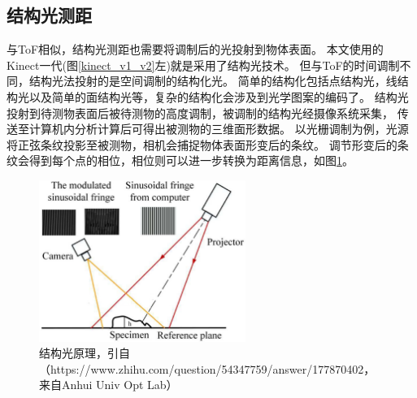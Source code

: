 \subsection{结构光测距}
与ToF相似，结构光测距也需要将调制后的光投射到物体表面。
本文使用的Kinect一代(图\ref{kinect_v1_v2}左)就是采用了结构光技术。
但与ToF的时间调制不同，结构光法投射的是空间调制的结构化光。
简单的结构化包括点结构光，线结构光以及简单的面结构光等，复杂的结构化会涉及到光学图案的编码了。
结构光投射到待测物表面后被待测物的高度调制，被调制的结构光经摄像系统采集，
传送至计算机内分析计算后可得出被测物的三维面形数据。
以光栅调制为例，光源将正弦条纹投影至被测物，相机会捕捉物体表面形变后的条纹。
调节形变后的条纹会得到每个点的相位，相位则可以进一步转换为距离信息，如图\ref{str_lighting}。
\begin{figure}[h]
    \centering
    \includegraphics[width = 0.6\textwidth]{./Pictures/str_lighting.eps}
    \caption{结构光原理，引自（https://www.zhihu.com/question/54347759/answer/177870402，来自Anhui Univ Opt Lab）}
    \label{str_lighting}
\end{figure}
